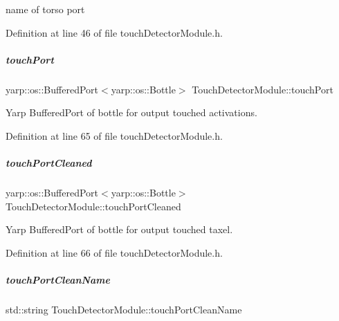 name of torso port 



Definition at line 46 of file touch\+Detector\+Module.\+h.

\mbox{\label{group__touchDetector_a190764b1dba056d0f5b5264a1e471746}} 
\subparagraph{\texorpdfstring{touch\+Port}{touchPort}}
{\footnotesize\ttfamily yarp\+::os\+::\+Buffered\+Port$<$yarp\+::os\+::\+Bottle$>$ Touch\+Detector\+Module\+::touch\+Port\hspace{0.3cm}{\ttfamily [protected]}}



Yarp Buffered\+Port of bottle for output touched activations. 



Definition at line 65 of file touch\+Detector\+Module.\+h.

\mbox{\label{group__touchDetector_a6e84947d95f4c06fc49d45794cf73bed}} 
\subparagraph{\texorpdfstring{touch\+Port\+Cleaned}{touchPortCleaned}}
{\footnotesize\ttfamily yarp\+::os\+::\+Buffered\+Port$<$yarp\+::os\+::\+Bottle$>$ Touch\+Detector\+Module\+::touch\+Port\+Cleaned\hspace{0.3cm}{\ttfamily [protected]}}



Yarp Buffered\+Port of bottle for output touched taxel. 



Definition at line 66 of file touch\+Detector\+Module.\+h.

\mbox{\label{group__touchDetector_a8abc1c42a1824678d6d496ce7a211f03}} 
\subparagraph{\texorpdfstring{touch\+Port\+Clean\+Name}{touchPortCleanName}}
{\footnotesize\ttfamily std\+::string Touch\+Detector\+Module\+::touch\+Port\+Clean\+Name\hspace{0.3cm}{\ttfamily [protected]}}



